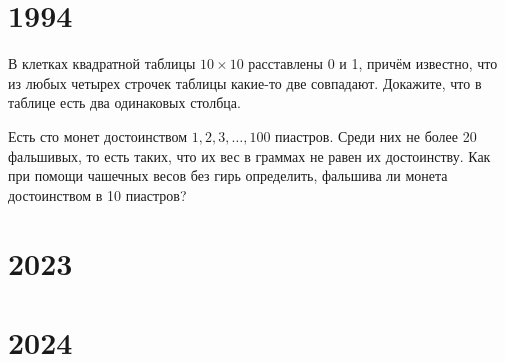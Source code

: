 \documentclass[11pt, a4paper]{problems_template}
\begin{document}
\chapter{1994}

\begin{exercise}
В клетках квадратной таблицы $10 \times 10$ расставлены 0 и 1, причём известно, что из любых четырех строчек таблицы какие-то две совпадают. Докажите, что в таблице есть два одинаковых столбца.
\end{exercise}

\begin{exercise}
Есть сто монет достоинством $1, 2, 3, \dots, 100$ пиастров. Среди них не более 20 фальшивых, то есть таких, что их вес в граммах не равен их достоинству. Как при помощи чашечных весов без гирь определить, фальшива ли монета достоинством в 10 пиастров?
\end{exercise}

\chapter{2023}

\chapter{2024}
\end{document}
